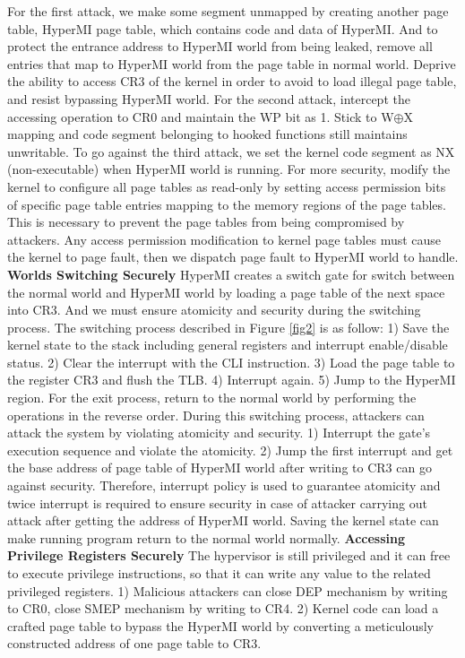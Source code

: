 \documentclass[conference]{IEEEtran}
\begin{document}
For the first attack, we make some segment unmapped by creating another page table, HyperMI page table, which contains code and data of HyperMI. And to protect the entrance address to HyperMI world from being leaked,
remove all entries that map to HyperMI world from the page table in normal world. Deprive the ability to access CR3 of the kernel in order to avoid to load illegal page table, and resist bypassing HyperMI world.
For the second attack, intercept the accessing operation to CR0 and maintain the WP bit as 1. Stick to W$\oplus${X} mapping and code segment belonging to hooked functions still maintains unwritable.
To go against the third attack, we set the kernel code segment as NX (non-executable) when HyperMI world is running. For more security, modify the kernel to configure all page tables as read-only by setting access permission bits of specific page table entries mapping to the memory regions of the page tables. This is necessary to prevent the page tables from being compromised by attackers. Any access permission modification to kernel page tables must cause the kernel to page fault, then we dispatch page fault to HyperMI world to handle.
\textbf{Worlds Switching Securely}
HyperMI creates a switch gate for switch between the normal world and HyperMI world by loading a page table of the next space into CR3. And we must ensure atomicity and security during the switching process.
The switching process described in Figure \ref{fig2} is as follow: 1) Save the kernel state to the stack including general registers and interrupt enable/disable status. 2) Clear the interrupt with the CLI instruction. 3) Load the page table to the register CR3 and flush the TLB. 4) Interrupt again. 5) Jump to the HyperMI region. For the exit process, return to the normal world by performing the operations in the reverse order.
During this switching process, attackers can attack the system by violating atomicity and security. 1) Interrupt the gate's execution sequence and violate the atomicity. 2) Jump the first interrupt and get the base address of page table of HyperMI world after writing to CR3 can go against security. Therefore, interrupt policy is used to guarantee atomicity and twice interrupt is required to ensure security in case of attacker carrying out attack after getting the address of HyperMI world. Saving the kernel state can make running program return to the normal world normally. 
\textbf{Accessing Privilege Registers Securely}
The hypervisor is still privileged and it can free to execute privilege instructions, so that it can write any value to the related privileged registers. 1) Malicious attackers can close DEP mechanism by writing to CR0, close SMEP mechanism by writing to CR4. 2) Kernel code can load a crafted page table to bypass the HyperMI world by converting a meticulously constructed address of one page table to CR3.
\end{document}
